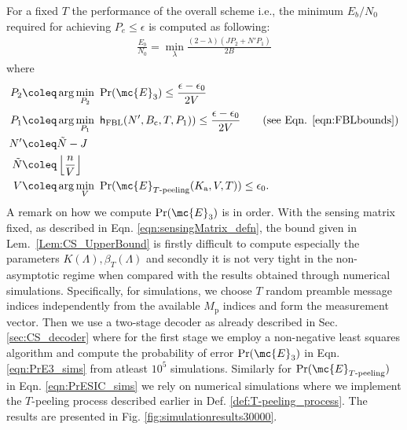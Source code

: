\documentclass[final,onecolumn,12pt]{IEEEtran}
\def\Ka{K_{\text{a}}}
\def\Pr{\mathrm{Pr}}
\def\hFBL{\mathsf{h}_{\text{FBL}}}
\begin{document}
\vspace{2pt}
For a fixed $T$ the performance of the overall scheme i.e., the minimum $E_b/N_0$ required for achieving $P_e\leq\epsilon$ is computed as following:
\begin{align}
\frac{E_b}{N_0}=\min_{\lambda} \frac{(2-\lambda)(JP_2+N'P_1)}{2B}
\label{eqn:EbN0_computation}
\end{align}
where
\begin{align}
P_2&\coleq \arg\min_{P_2}~\Pr(\mc{E}_3)\leq \frac{\epsilon-\epsilon_0}{2V}\label{eqn:PrE3_sims}\\
P_1&\coleq \arg\min_{P_1}~\hFBL(N',B_\mathrm{c},T,P_1))\leq \frac{\epsilon-\epsilon_0}{2V}\qquad (\text{see Eqn. }\eqref{eqn:FBLbounds})  \label{eqn:PrFBL_sims}\\
N'&\coleq\tilde{N}-J\notag\\
\tilde{N}&\coleq\left\lfloor \frac{n}{V}\right\rfloor \notag\\
V&\coleq \arg\min_{V}~\Pr(\mc{E}_{T\text{-peeling}}(\Ka,V,T))\leq \epsilon_0\label{eqn:PrESIC_sims}.
\end{align}
A remark on how we compute $\Pr(\mc{E}_3)$ is in order. With the sensing matrix fixed, as described in Eqn. \eqref{eqn:sensingMatrix_defn}, the bound given in Lem.~\ref{Lem:CS_UpperBound} is firstly difficult to compute especially the parameters $K(\Lambda),\beta_T(\Lambda)$ and secondly it is not very tight in the non-asymptotic regime when compared with the results obtained through numerical simulations. Specifically, for simulations, we choose $T$ random preamble message indices independently from the available $M_\mathrm{p}$ indices and form the measurement vector. Then we use a two-stage decoder as already described in Sec. \ref{sec:CS_decoder} where for the first stage we employ a non-negative least squares algorithm and compute the probability of error $\Pr(\mc{E}_3)$ in Eqn. \eqref{eqn:PrE3_sims} from atleast $10^5$ simulations. Similarly for $\Pr(\mc{E}_{T\text{-peeling}})$ in Eqn. \eqref{eqn:PrESIC_sims} we rely on numerical simulations where we implement the $T$-peeling process described earlier in Def. \ref{def:T-peeling_process}. The results are presented in Fig. \ref{fig:simulationresults30000}.
\end{document}
